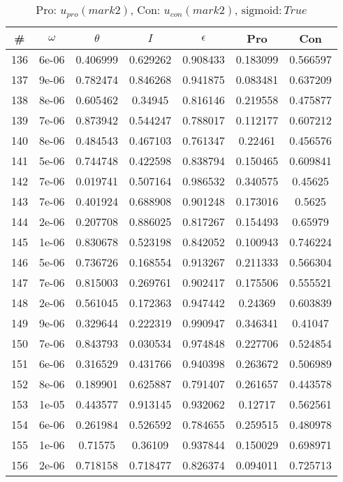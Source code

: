 \newpage
\begin{table}
\caption{Pro: $u_{pro} (mark 2)$, Con: $u_{con} (mark 2)$, $\mathrm{sigmoid}: True$}
\begin{tabular*}{\linewidth}{c|c|c|c|c|c|c}
\# & $\omega$ & $\theta$ & $I$ & $\epsilon$ & Pro & Con \\
\hline
136 & 6e-06 & 0.406999 & 0.629262 & 0.908433 & 0.183099 & 0.566597\\
137 & 9e-06 & 0.782474 & 0.846268 & 0.941875 & 0.083481 & 0.637209\\
138 & 8e-06 & 0.605462 & 0.34945 & 0.816146 & 0.219558 & 0.475877\\
139 & 7e-06 & 0.873942 & 0.544247 & 0.788017 & 0.112177 & 0.607212\\
140 & 8e-06 & 0.484543 & 0.467103 & 0.761347 & 0.22461 & 0.456576\\
141 & 5e-06 & 0.744748 & 0.422598 & 0.838794 & 0.150465 & 0.609841\\
142 & 7e-06 & 0.019741 & 0.507164 & 0.986532 & 0.340575 & 0.45625\\
143 & 7e-06 & 0.401924 & 0.688908 & 0.901248 & 0.173016 & 0.5625\\
144 & 2e-06 & 0.207708 & 0.886025 & 0.817267 & 0.154493 & 0.65979\\
145 & 1e-06 & 0.830678 & 0.523198 & 0.842052 & 0.100943 & 0.746224\\
146 & 5e-06 & 0.736726 & 0.168554 & 0.913267 & 0.211333 & 0.566304\\
147 & 7e-06 & 0.815003 & 0.269761 & 0.902417 & 0.175506 & 0.555521\\
148 & 2e-06 & 0.561045 & 0.172363 & 0.947442 & 0.24369 & 0.603839\\
149 & 9e-06 & 0.329644 & 0.222319 & 0.990947 & 0.346341 & 0.41047\\
150 & 7e-06 & 0.843793 & 0.030534 & 0.974848 & 0.227706 & 0.524854\\
151 & 6e-06 & 0.316529 & 0.431766 & 0.940398 & 0.263672 & 0.506989\\
152 & 8e-06 & 0.189901 & 0.625887 & 0.791407 & 0.261657 & 0.443578\\
153 & 1e-05 & 0.443577 & 0.913145 & 0.932062 & 0.12717 & 0.562561\\
154 & 6e-06 & 0.261984 & 0.526592 & 0.784655 & 0.259515 & 0.480978\\
155 & 1e-06 & 0.71575 & 0.36109 & 0.937844 & 0.150029 & 0.698971\\
156 & 2e-06 & 0.718158 & 0.718477 & 0.826374 & 0.094011 & 0.725713\\

\end{tabular*}
\end{table}
